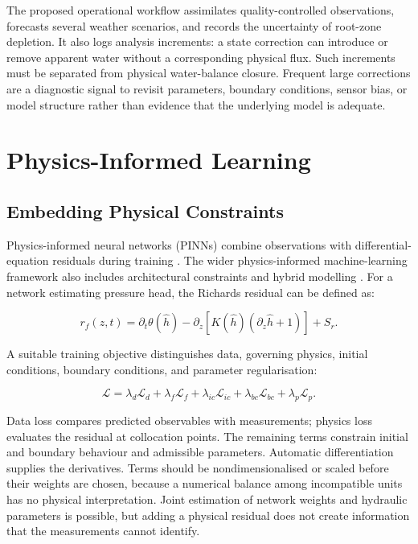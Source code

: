 \documentclass[11pt,a4paper]{article}
\begin{document}
The proposed operational workflow assimilates quality-controlled observations, forecasts several weather scenarios, and records the uncertainty of root-zone depletion. It also logs analysis increments: a state correction can introduce or remove apparent water without a corresponding physical flux. Such increments must be separated from physical water-balance closure. Frequent large corrections are a diagnostic signal to revisit parameters, boundary conditions, sensor bias, or model structure rather than evidence that the underlying model is adequate.

\section{Physics-Informed Learning}

\label{sec:6}

\subsection{Embedding Physical Constraints}

\label{sec:6-1}

Physics-informed neural networks (PINNs) combine observations with differential-equation residuals during training \cite{R13}. The wider physics-informed machine-learning framework also includes architectural constraints and hybrid modelling \cite{R14}. For a network estimating pressure head, the Richards residual can be defined as:

\begin{equation}
r_f(z,t)=\partial_t\theta(\hat h)-\partial_z\left[K(\hat h)(\partial_z\hat h+1)\right]+S_r.
\label{eq:9}
\end{equation}

A suitable training objective distinguishes data, governing physics, initial conditions, boundary conditions, and parameter regularisation:

\begin{equation}
\mathcal L=\lambda_d\mathcal L_d+\lambda_f\mathcal L_f+\lambda_{ic}\mathcal L_{ic}+\lambda_{bc}\mathcal L_{bc}+\lambda_p\mathcal L_p.
\label{eq:10}
\end{equation}

Data loss compares predicted observables with measurements; physics loss evaluates the residual at collocation points. The remaining terms constrain initial and boundary behaviour and admissible parameters. Automatic differentiation supplies the derivatives. Terms should be nondimensionalised or scaled before their weights are chosen, because a numerical balance among incompatible units has no physical interpretation. Joint estimation of network weights and hydraulic parameters is possible, but adding a physical residual does not create information that the measurements cannot identify.
\end{document}
